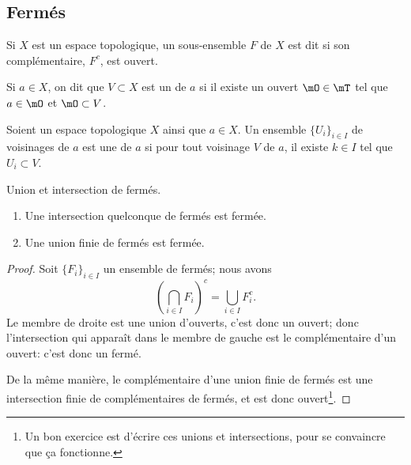 \subsection{Fermés}

\begin{definition}	\label{DEFFermeooNSAAooHxZbAo}
    Si \(X \) est un espace topologique, un sous-ensemble \( F \) de \( X \) est dit  si son complémentaire, \( F^c \), est ouvert.
\end{definition}

\begin{definition}		\label{DEFVoisinageooGHZCooLRcpXY}
    Si \(a \in X\), on dit que \(V \subset X\) est un  de \(a\) si il existe un ouvert \(\mO \in \mT\) tel que \(a \in \mO\) et \(\mO \subset V\).
\end{definition}

\begin{definition}       \label{DEFooBWZIooXotZLA}
    Soient un espace topologique \( X\) ainsi que \( a\in X\). Un ensemble \( \{ U_i \}_{i\in I}\) de voisinages de \( a\) est une  de \( a\) si pour tout voisinage \( V\) de \( a\), il existe \( k\in I\) tel que \( U_i\subset V\).
\end{definition}

\begin{lemma}   \label{LemQYUJwPC}
    Union et intersection de fermés.
    \begin{enumerate}
        \item       \label{ITEMooBHIGooMvkUtX}
            Une intersection quelconque de fermés est fermée.
        \item       \label{ItemKJYVooMBmMbG}
            Une union finie de fermés est fermée.
    \end{enumerate}
\end{lemma}

\begin{proof}
    Soit \( \{ F_i \}_{i\in I} \) un ensemble de fermés; nous avons
    \begin{equation}
        \left( \bigcap_{i\in I}F_i \right)^c=\bigcup_{i\in I}F_i^c.
    \end{equation}
    Le membre de droite est une union d'ouverts, c'est donc un ouvert; donc l'intersection qui apparaît dans le membre de gauche est le complémentaire d'un ouvert: c'est donc un fermé.

    De la même manière, le complémentaire d'une union finie de fermés est une intersection finie de complémentaires de fermés, et est donc ouvert\footnote{Un bon exercice est d'écrire ces unions et intersections, pour se convaincre que ça fonctionne.}.
\end{proof}

